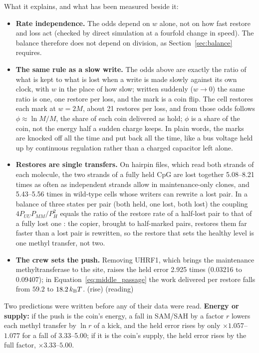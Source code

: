 What it explains, and what has been measured beside it:
\begin{itemize}
\item \textbf{Rate independence.} The odds depend on $w$ alone, not on how fast restore and loss act (checked by direct simulation at a
  fourfold change in speed). The balance therefore does not depend on division, as Section~\ref{sec:balance} requires. \derived \item \textbf{The same rule as a slow write.} The odds above are exactly the ratio of what is kept to what is lost when a write is made slowly against its own clock, with $w$ in the place of how slow; written suddenly ($w\to0$) the same ratio is one, one restore per loss, and the mark is a coin flip. The cell restores each mark at $w=2M$, about 21 restores per loss, and from those odds follows $\phi\approx\ln M/M$, the share of each coin delivered as hold; $\phi$ is a share of the coin, not the energy half a sudden charge keeps. In plain words, the marks are knocked off all the time and put back all the time, like a bus voltage held up by continuous regulation rather than a charged capacitor left alone. \derived
\item \textbf{Restores are single transfers.} On hairpin files, which read both strands of each molecule, the two strands of a fully held
  CpG are lost together 5.08--8.21 times as often as independent strands allow in maintenance-only clones, and 5.43--5.56 times in wild-type
  cells whose writers can rewrite a lost pair. \measured{} In a balance of three states per pair (both held, one lost, both lost) the
  coupling $4P_{UU}P_{MM}/P_{H}^2$ equals the ratio of the restore rate of a half-lost pair to that of a fully lost one \derived{}: the copier,
  brought to half-marked pairs, restores them far faster than a lost pair is rewritten, so the restore that sets the healthy level is one
  methyl transfer, not two. \interp
\item \textbf{The crew sets the push.} Removing UHRF1, which brings the maintenance methyltransferase to the site, raises the held error
  2.925 times (0.03216 to 0.09407); in Equation~\eqref{eq:middle_passage} the work delivered per restore falls from $59.2$ to $18.2\,k_{\mathrm B} T$.
  \measured{} (rise) \interp{} (reading)
\end{itemize}

Two predictions were written before any of their data were read. \textbf{Energy or supply:} if the push is the coin's energy, a fall in
SAM/SAH by a factor $r$ lowers each methyl transfer by $\ln r$ of a kick, and the held error rises by only $\times1.057$--$1.077$ for a fall of
3.33--5.00; if it is the coin's supply, the held error rises by the full factor, $\times3.33$--$5.00$. \prediction

